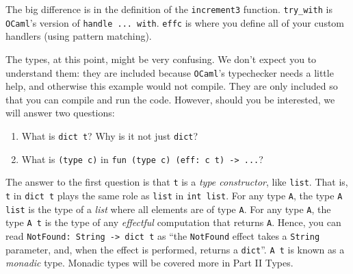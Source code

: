 The big difference is in the definition of the \texttt{increment3} function. \texttt{try\_with} is \texttt{OCaml}'s version of \texttt{handle ... with}. \texttt{effc} is where you define all of your custom handlers (using pattern matching). 

The types, at this point, might be very confusing. We don't expect you to understand them: they are included because \texttt{OCaml}'s typechecker needs a little help, and otherwise this example would not compile. They are only included so that you can compile and run the code. However, should you be interested, we will answer two questions:
\begin{enumerate}
    \item What is \texttt{dict t}? Why is it not just \texttt{dict}?
    \item What is \texttt{(type c)} in \texttt{fun (type c) (eff: c t) -> ...}?
\end{enumerate}

The answer to the first question is that \texttt{t} is a \textit{type constructor}, like \texttt{list}. That is, \texttt{t} in \texttt{dict t} plays the same role as \texttt{list} in \texttt{int list}. For any type \texttt{A}, the type \texttt{A list} is the type of a \textit{list} where all elements are of type \texttt{A}. For any type \texttt{A}, the type \texttt{A t} is the type of any \textit{effectful} computation that returns \texttt{A}. Hence, you can read \texttt{NotFound: String -> dict t} as ``the \texttt{NotFound} effect takes a \texttt{String} parameter, and, when the effect is performed, returns a \texttt{dict}''. \texttt{A t} is known as a \textit{monadic} type. Monadic types will be covered more in \textsf{Part II Types}.


